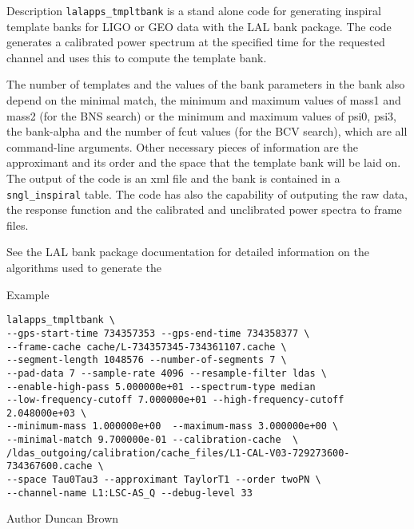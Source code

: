 \begin{entry}
\item[Description] 
\verb$lalapps_tmpltbank$ is a stand alone code for generating inspiral
template banks for LIGO or GEO data with the LAL bank package.  The code 
generates a calibrated power spectrum at the specified time for the 
requested channel and uses this to compute the template bank.  

The number of templates and the
values of the bank parameters in the bank also depend on the minimal
match, the
minimum and maximum values of mass1 and mass2 (for the BNS search) or the
minimum and maximum values of psi0, psi3, the bank-alpha and the number of
fcut values (for the BCV search), which are all command-line arguments.
Other necessary pieces of information are the approximant and its order and
the space that the template bank will be laid on. The output of the code is
an xml file and the bank is contained in a \verb$sngl_inspiral$ table. The code has
also the capability of outputing the raw data, the response function and the
calibrated and unclibrated power spectra to frame files.


See the LAL bank package
documentation for detailed information on the algorithms used to generate the
\item[Example]
\begin{verbatim}
lalapps_tmpltbank \
--gps-start-time 734357353 --gps-end-time 734358377 \
--frame-cache cache/L-734357345-734361107.cache \
--segment-length 1048576 --number-of-segments 7 \
--pad-data 7 --sample-rate 4096 --resample-filter ldas \
--enable-high-pass 5.000000e+01 --spectrum-type median
--low-frequency-cutoff 7.000000e+01 --high-frequency-cutoff 2.048000e+03 \
--minimum-mass 1.000000e+00  --maximum-mass 3.000000e+00 \
--minimal-match 9.700000e-01 --calibration-cache  \
/ldas_outgoing/calibration/cache_files/L1-CAL-V03-729273600-734367600.cache \
--space Tau0Tau3 --approximant TaylorT1 --order twoPN \
--channel-name L1:LSC-AS_Q --debug-level 33

\end{verbatim}

\item[Author] 
Duncan Brown
\end{entry}


